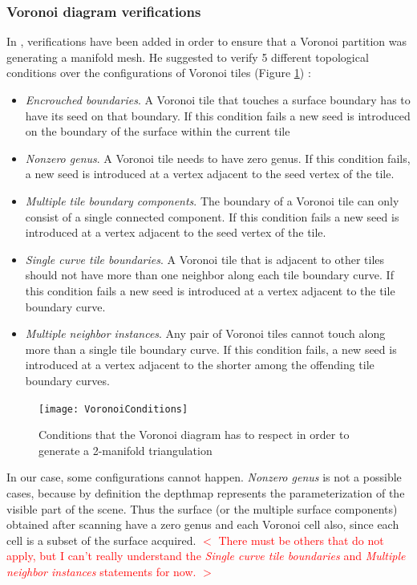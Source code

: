 \documentclass[11pt,fleqn]{book} %
\newcommand{\arnaud}[1]{\textcolor{red}{$<$ #1 $>$}}
\begin{document}
\subsubsection{Voronoi diagram verifications}
In \cite{Gus07}, verifications have been added in order to ensure that a Voronoi partition was generating a manifold mesh.
He suggested to verify 5 different topological conditions over the configurations of Voronoi tiles (Figure \ref{fig:voronoi_conditions}) : 
\begin{itemize}
	\item \textit{Encrouched boundaries}. A Voronoi tile that touches a surface boundary has to have its seed on that boundary. 
	If this condition fails a new seed is introduced on the boundary of the surface within the current tile
	\item \textit{Nonzero genus}. A Voronoi tile needs to have zero genus. If this condition fails, a new seed is introduced at a vertex adjacent to the seed vertex of the tile.
	\item \textit{Multiple tile boundary components}. The boundary of a Voronoi tile can only consist of a single connected component. If this condition fails a new seed is introduced at a vertex adjacent to the seed vertex of the tile.
	\item \textit{Single curve tile boundaries}. A Voronoi tile that is adjacent to other tiles should not have more than one neighbor along each tile boundary curve. If this condition fails a new seed is introduced at a vertex adjacent to the tile boundary curve.
	\item \textit{Multiple neighbor instances}. Any pair of Voronoi tiles cannot touch along more than a single tile boundary curve. If this condition fails, a new seed is introduced at a vertex adjacent to the shorter among the offending tile boundary curves.
\end{itemize}

\begin{figure}[ht]
\centering\texttt{[image: VoronoiConditions]}
\caption{Conditions that the Voronoi diagram has to respect in order to generate a 2-manifold triangulation \cite{Gus07}}
\label{fig:voronoi_conditions}
\end{figure}

In our case, some configurations cannot happen.
\textit{Nonzero genus} is not a possible cases, because by definition the depthmap represents the parameterization of the visible part of the scene. Thus the surface (or the multiple surface components) obtained after scanning have a zero genus and each Voronoi cell also, since each cell is a subset of the surface acquired.
\arnaud{There must be others that do not apply, but I can't really understand the \textit{Single curve tile boundaries} and \textit{Multiple neighbor instances} statements for now.}
\end{document}
